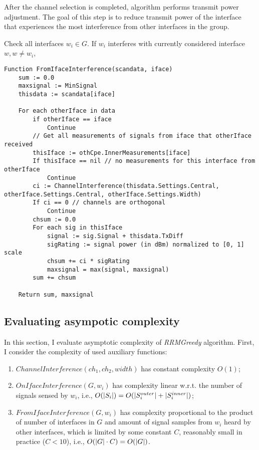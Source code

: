 After the channel selection is completed, algorithm performs transmit power adjustment. The goal of this step is to reduce transmit power of the interface that experiences the most interference from other interfaces in the group.

Check all interfaces $w_i \in G$.
If $w_i$ interferes with currently considered interface $w, w \ne w_i$,
\begin{lstlisting}[language={Pseudo}, caption=FromIfaceInterference() function., label=lst:interf_from_cpe]
Function FromIfaceInterference(scandata, iface)
    sum := 0.0
    maxsignal := MinSignal
    thisdata := scandata[iface]

    For each otherIface in data
        if otherIface == iface
            Continue
        // Get all measurements of signals from iface that otherIface received
        thisIface := othCpe.InnerMeasurements[iface]
        If thisIface == nil // no measurements for this interface from otherIface
            Continue
        ci := ChannelInterference(thisdata.Settings.Central, otherIface.Settings.Central, otherIface.Settings.Width)
        If ci == 0 // channels are orthogonal
            Continue
        chsum := 0.0
        For each sig in thisIface
            signal := sig.Signal + thisdata.TxDiff
            sigRating := signal power (in dBm) normalized to [0, 1] scale
            chsum += ci * sigRating
            maxsignal = max(signal, maxsignal)
        sum += chsum

    Return sum, maxsignal
\end{lstlisting}

\subsection{Evaluating asympotic complexity}
\label{sec:complexity}
In this section, I evaluate asymptotic complexity of \textit{RRMGreedy} algorithm.
First, I consider the complexity of used auxiliary functions:
\begin{enumerate}
    \item $ChannelInterference(ch_1, ch_2, width)$ has constant complexity $O(1)$;
    \item $OnIfaceInterference(G, w_i)$ has complexity linear w.r.t. the number of signals sensed by $w_i$, i.e.,
        $O(\lvert{S_i}\rvert) = O(\lvert{S^{outer}_i}\rvert + \lvert{S^{inner}_i}\rvert)$;
    \item $FromIfaceInterference(G, w_i)$ has complexity proportional to the product of number of interfaces in $G$ and amount of signal samples from $w_i$ heard by other interfaces, which is limited by some constant $C$, reasonably small in practice ($C < 10$), i.e.,
        $O(\lvert{G}\rvert \cdot C) = O(\lvert{G}\rvert)$.
\end{enumerate}

